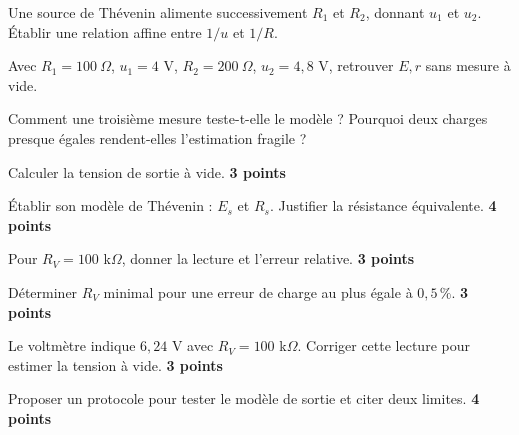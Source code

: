 \label{ch02-ex-D3}
\begin{questions}
\item Une source de Thévenin alimente successivement $R_1$ et $R_2$, donnant $u_1$ et $u_2$. Établir une relation affine entre $1/u$ et $1/R$.
\item Avec $R_1=100\ \Omega$, $u_1=4$ V, $R_2=200\ \Omega$, $u_2=4{,}8$ V, retrouver $E,r$ sans mesure à vide.
\item Comment une troisième mesure teste-t-elle le modèle ? Pourquoi deux charges presque égales rendent-elles l’estimation fragile ?
\end{questions}


\begin{questions}
\item Calculer la tension de sortie à vide. \textbf{3 points}
\item Établir son modèle de Thévenin : $E_s$ et $R_s$. Justifier la résistance équivalente. \textbf{4 points}
\item Pour $R_V=100$ k$\Omega$, donner la lecture et l’erreur relative. \textbf{3 points}
\item Déterminer $R_V$ minimal pour une erreur de charge au plus égale à $0{,}5\,\%$. \textbf{3 points}
\item Le voltmètre indique $6{,}24$ V avec $R_V=100$ k$\Omega$. Corriger cette lecture pour estimer la tension à vide. \textbf{3 points}
\item Proposer un protocole pour tester le modèle de sortie et citer deux limites. \textbf{4 points}
\end{questions}


